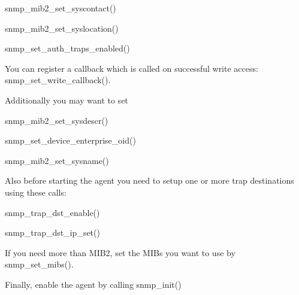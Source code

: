 \begin{DoxyItemize}
\item snmp\+\_\+mib2\+\_\+set\+\_\+syscontact()
\item snmp\+\_\+mib2\+\_\+set\+\_\+syslocation()
\item snmp\+\_\+set\+\_\+auth\+\_\+traps\+\_\+enabled()
\end{DoxyItemize}

You can register a callback which is called on successful write access\+: snmp\+\_\+set\+\_\+write\+\_\+callback().

Additionally you may want to set


\begin{DoxyItemize}
\item snmp\+\_\+mib2\+\_\+set\+\_\+sysdescr()
\item snmp\+\_\+set\+\_\+device\+\_\+enterprise\+\_\+oid()
\item snmp\+\_\+mib2\+\_\+set\+\_\+sysname()
\end{DoxyItemize}

Also before starting the agent you need to setup one or more trap destinations using these calls\+:


\begin{DoxyItemize}
\item snmp\+\_\+trap\+\_\+dst\+\_\+enable()
\item snmp\+\_\+trap\+\_\+dst\+\_\+ip\+\_\+set()
\end{DoxyItemize}

If you need more than M\+I\+B2, set the M\+I\+Bs you want to use by snmp\+\_\+set\+\_\+mibs().

Finally, enable the agent by calling snmp\+\_\+init() 